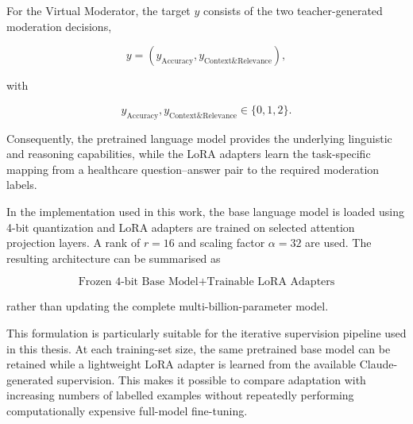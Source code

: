 \documentclass[11pt,a4paper]{article}
\begin{document}
For the Virtual Moderator, the target $y$ consists of the two
teacher-generated moderation decisions,

\[
    y =
    \left(
        y_{\text{Accuracy}},
        y_{\text{Context\&Relevance}}
    \right),
\]

with

\[
    y_{\text{Accuracy}},
    y_{\text{Context\&Relevance}}
    \in \{0,1,2\}.
\]

Consequently, the pretrained language model provides the underlying linguistic
and reasoning capabilities, while the LoRA adapters learn the task-specific
mapping from a healthcare question--answer pair to the required moderation
labels.

In the implementation used in this work, the base language model is loaded
using 4-bit quantization and LoRA adapters are trained on selected attention
projection layers. A rank of $r=16$ and scaling factor $\alpha=32$ are used.
The resulting architecture can be summarised as

\[
    \boxed{
    \text{Frozen 4-bit Base Model}
    +
    \text{Trainable LoRA Adapters}
    }
\]

rather than updating the complete multi-billion-parameter model.

This formulation is particularly suitable for the iterative supervision
pipeline used in this thesis. At each training-set size, the same pretrained
base model can be retained while a lightweight LoRA adapter is learned from
the available Claude-generated supervision. This makes it possible to compare
adaptation with increasing numbers of labelled examples without repeatedly
performing computationally expensive full-model fine-tuning.
\end{document}
